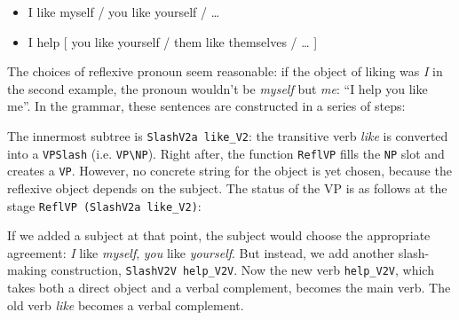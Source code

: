 \begin{itemize}
\itemsep1pt\parskip0pt
\item
  I like myself / you like yourself / \ldots{}
\item
  I help [ you like yourself / them like themselves / \ldots{} ]
\end{itemize}

The choices of reflexive pronoun seem reasonable: if the object of liking was \emph{I}
in the second example, the pronoun wouldn't be \emph{myself} but \emph{me}: ``I
help you like me''.
In the \gf{} grammar, these sentences are constructed in a series of steps:
\begin{EmptyItem}
\begin{Highlighting}[]
 \NormalTok{(} 
       \NormalTok{(}
           \NormalTok{(} 
               \NormalTok{(}
                 \NormalTok{(} 
               \NormalTok{)}
           \NormalTok{)}
           \NormalTok{(} 
       \NormalTok{)}
\end{Highlighting}
\end{EmptyItem}

The innermost subtree is \texttt{SlashV2a like\_V2}: the transitive verb
\emph{like} is converted into a \texttt{VPSlash} (i.e.
\texttt{VP\textbackslash{}NP}). Right after, the function
\texttt{ReflVP} fills the \texttt{NP} slot and creates a \texttt{VP}.
However, no concrete string for the object is yet chosen, because the
reflexive object depends on the subject. The status of the VP is as
follows at the stage \texttt{ReflVP (SlashV2a like\_V2)}:

\begin{EmptyItem}
\begin{Highlighting}[]
    \FunctionTok{=}  \NormalTok{;}
\FunctionTok{=}  \OtherTok{=>}  \NormalTok{; } \OtherTok{=>}  
\FunctionTok{=} \NormalTok{[] ;}
\end{Highlighting}
\end{EmptyItem}

If we added a subject at that point, the subject would choose the
appropriate agreement: \emph{I} like \emph{myself}, \emph{you} like
\emph{yourself}. But instead, we add another slash-making construction,
\texttt{SlashV2V help\_V2V}. Now the new verb \texttt{help\_V2V}, which
takes both a direct object and a verbal complement, becomes the main
verb. The old verb \emph{like} becomes a verbal complement.

